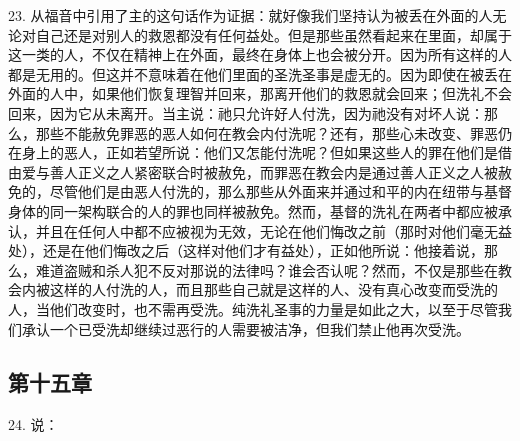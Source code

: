 23. 从福音中引用了主的这句话作为证据：就好像我们坚持认为被丢在外面的人无论对自己还是对别人的救恩都没有任何益处。但是那些虽然看起来在里面，却属于这一类的人，不仅在精神上在外面，最终在身体上也会被分开。因为所有这样的人都是无用的。但这并不意味着在他们里面的圣洗圣事是虚无的。因为即使在被丢在外面的人中，如果他们恢复理智并回来，那离开他们的救恩就会回来；但洗礼不会回来，因为它从未离开。当主说：祂只允许好人付洗，因为祂没有对坏人说：那么，那些不能赦免罪恶的恶人如何在教会内付洗呢？还有，那些心未改变、罪恶仍在身上的恶人，正如若望所说：他们又怎能付洗呢？但如果这些人的罪在他们是借由爱与善人正义之人紧密联合时被赦免，而罪恶在教会内是通过善人正义之人被赦免的，尽管他们是由恶人付洗的，那么那些从外面来并通过和平的内在纽带与基督身体的同一架构联合的人的罪也同样被赦免。然而，基督的洗礼在两者中都应被承认，并且在任何人中都不应被视为无效，无论在他们悔改之前（那时对他们毫无益处），还是在他们悔改之后（这样对他们才有益处），正如他所说：他接着说，那么，难道盗贼和杀人犯不反对那说的法律吗？谁会否认呢？然而，不仅是那些在教会内被这样的人付洗的人，而且那些自己就是这样的人、没有真心改变而受洗的人，当他们改变时，也不需再受洗。纯洗礼圣事的力量是如此之大，以至于尽管我们承认一个已受洗却继续过恶行的人需要被洁净，但我们禁止他再次受洗。\par


\subsection{第十五章}

24. 说：\par

